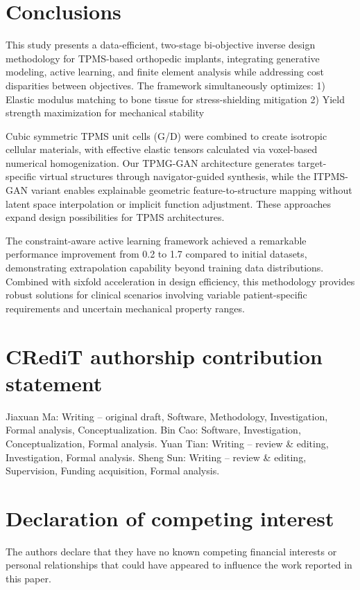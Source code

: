 \documentclass[preprint,review,12pt,authoryear]{elsarticle}
\begin{document}
\section{Conclusions}
This study presents a data-efficient, two-stage bi-objective inverse design methodology for TPMS-based orthopedic implants, integrating generative modeling, active learning, and finite element analysis while addressing cost disparities between objectives. The framework simultaneously optimizes:
1) Elastic modulus matching to bone tissue for stress-shielding mitigation
2) Yield strength maximization for mechanical stability

Cubic symmetric TPMS unit cells (G/D) were combined to create isotropic cellular materials, with effective elastic tensors calculated via voxel-based numerical homogenization. Our TPMG-GAN architecture generates target-specific virtual structures through navigator-guided synthesis, while the ITPMS-GAN variant enables explainable geometric feature-to-structure mapping without latent space interpolation or implicit function adjustment. These approaches expand design possibilities for TPMS architectures.

The constraint-aware active learning framework achieved a remarkable performance improvement from 0.2 to 1.7 compared to initial datasets, demonstrating extrapolation capability beyond training data distributions. Combined with sixfold acceleration in design efficiency, this methodology provides robust solutions for clinical scenarios involving variable patient-specific requirements and uncertain mechanical property ranges.

\section*{CRediT authorship contribution statement}
Jiaxuan Ma: Writing – original draft, Software, Methodology, Investigation, Formal analysis, Conceptualization. Bin Cao: Software, Investigation, Conceptualization, Formal analysis. Yuan Tian: Writing – review \& editing, Investigation, Formal analysis. Sheng Sun: Writing – review \& editing, Supervision, Funding acquisition, Formal analysis.

\section*{Declaration of competing interest}
The authors declare that they have no known competing financial interests or personal relationships that could have appeared to influence the work reported in this paper.
\end{document}
